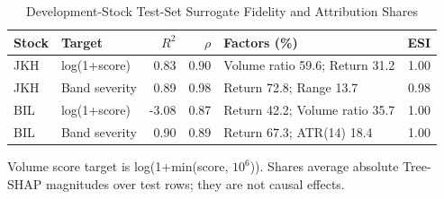 \begin{table}[!t]
\caption{Development-Stock Test-Set Surrogate Fidelity and Attribution Shares}
\label{tab:explain}
\centering\footnotesize
\setlength{\tabcolsep}{2.7pt}
\begin{tabular}{@{}llrrlr@{}}
\toprule
Stock & Target & $R^2$ & $\rho$ & Factors (\%) & ESI \\
\midrule
JKH & log(1+score) & 0.83 & 0.90 & Volume ratio 59.6; Return 31.2 & 1.00 \\
JKH & Band severity & 0.89 & 0.98 & Return 72.8; Range 13.7 & 0.98 \\
BIL & log(1+score) & -3.08 & 0.87 & Return 42.2; Volume ratio 35.7 & 1.00 \\
BIL & Band severity & 0.90 & 0.89 & Return 67.3; ATR(14) 18.4 & 1.00 \\
\bottomrule
\end{tabular}
\parbox{\columnwidth}{\scriptsize Volume score target is log(1+min(score, $10^6$)). Shares average absolute Tree-SHAP magnitudes over test rows; they are not causal effects.}
\end{table}